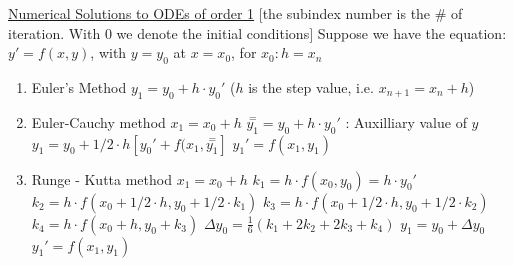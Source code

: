 \documentclass[12pt]{article}
\begin{document}
\begin{flushleft}
	\uline{Numerical Solutions to ODEs of order 1} \linebreak 
	$[$the subindex number is the $\#$ of iteration. With $0$ we denote the initial conditions$]$ \linebreak 
	\textbullet \quad Suppose we have the equation: $y' = f(x,y)$, with $y=y_0$ at $x=x_0$, for $x_0: h = x_n$  
	\begin{enumerate}
	\item Euler's Method \linebreak 
	$\displaystyle y_1=y_0 + h \cdot y_0'$ ($h$ is the step value, i.e. $x_{n+1} = x_n + h$) 
	\item Euler-Cauchy method \linebreak 
	$x_1 = x_0 + h$ \linebreak 
	$\displaystyle \overset{=}{y_1} = y_0 + h \cdot y_0'$  :  Auxilliary value of $y$ \linebreak 
	$\displaystyle y_1 = y_0 + 1/2 \cdot h \left[ y_0' + f(x_1, \overset{=}{y_1} \right] $ \linebreak 
	$\displaystyle y_1' = f(x_1,y_1)$ 
	\item Runge - Kutta method \linebreak 
	$\displaystyle x_1 = x_0 + h$ \linebreak 
	$\displaystyle k_1 = h \cdot f(x_0, y_0) = h \cdot y_0'$ \linebreak 
	$\displaystyle k_2 = h \cdot f (x_0 + 1/2 \cdot h, y_0 + 1/2 \cdot k_1)$ \linebreak 
	$\displaystyle k_3 = h \cdot f(x_0 + 1/2 \cdot h, y_0 + 1/2 \cdot k_2)$ \linebreak 
	$\displaystyle k_4 = h \cdot f(x_0 + h, y_0 + k_3)$ \linebreak 
	$\displaystyle \Delta y_0 = \frac{1}{6} ( k_1 + 2k_2 + 2k_3 + k_4)$ \linebreak 
	$\displaystyle y_1 = y_0 + \Delta y_0$ \linebreak 
	$\displaystyle y_1' = f(x_1, y_1)$ 
	\end{enumerate}  
	

\end{flushleft}
\end{document}
